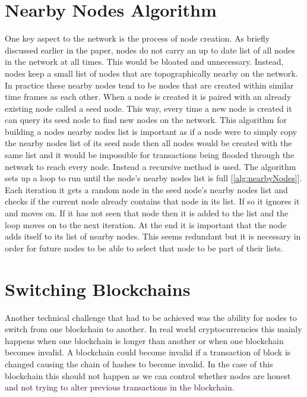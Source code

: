 \documentclass{l4proj}
\begin{document}
\section{Nearby Nodes Algorithm}
One key aspect to the network is the process of node creation. As briefly discussed earlier in the paper, nodes
do not carry an up to date list of all nodes in the network at all times. This would be bloated and unnecessary.
Instead, nodes keep a small list of nodes that are topographically nearby on the network. In practice these nearby
nodes tend to be nodes that are created within similar time frames as each other. When a node is created it is
paired with an already existing node called a seed node. This way, every time a new node is created it can query
its seed node to find new nodes on the network. This algorithm for building a nodes nearby nodes list is important
as if a node were to simply copy the nearby nodes list of its seed node then all nodes would be created with the
same list and it would be impossible for transactions being flooded through the network to reach every node. Instead
a recursive method is used. The algorithm sets up a loop to run until the node's nearby nodes list is full
[\ref{alg:nearbyNodes}]. Each iteration it gets a random node in the seed node's nearby nodes list and checks if 
the current node already contains that node in its list. If so it ignores it and moves on. If it has not seen 
that node then it is added to the list and the loop moves on to the next iteration. At the end it is important 
that the node adds itself to its list of nearby nodes. This seems redundant but it is necessary in order for 
future nodes to be able to select that node to be part of their lists.

\section{Switching Blockchains}
Another technical challenge that had to be achieved was the ability for nodes to switch from one blockchain
to another. In real world cryptocurrencies this mainly happens when one blockchain is longer than another or
when one blockchain becomes invalid. A blockchain could become invalid if a transaction of block is changed 
causing the chain of hashes to become invalid. In the case of this blockchain this should not happen as we can
control whether nodes are honest and not trying to alter previous transactions in the blockchain.
\end{document}
